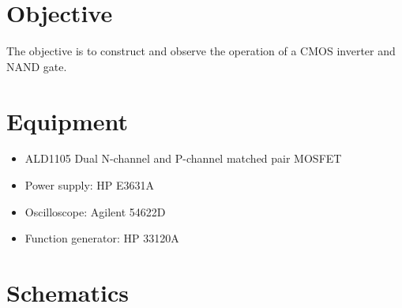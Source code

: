 

\section{Objective}
\label{sec:objective}

The objective is to construct and observe the operation of a CMOS inverter and NAND gate.

\section{Equipment}
\label{sec:equipment}

\begin{itemize}
\item ALD1105 Dual N-channel and P-channel matched pair MOSFET
\item Power supply: HP E3631A
\item Oscilloscope: Agilent 54622D
\item Function generator: HP 33120A
\end{itemize}

 \section{Schematics}
 \label{sec:schematics}

